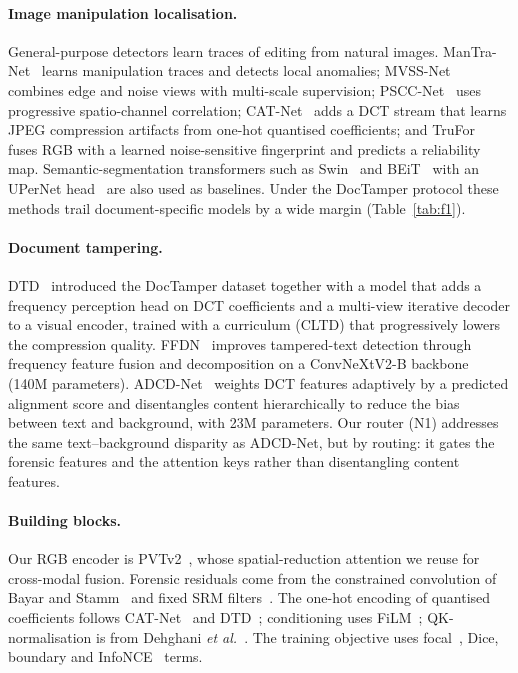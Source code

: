 \documentclass[11pt,a4paper]{article}
\begin{document}
\paragraph{Image manipulation localisation.} General-purpose detectors learn traces of
editing from natural images. ManTra-Net~\cite{mantra} learns manipulation traces and detects
local anomalies; MVSS-Net~\cite{mvss} combines edge and noise views with multi-scale
supervision; PSCC-Net~\cite{pscc} uses progressive spatio-channel correlation;
CAT-Net~\cite{catnet} adds a DCT stream that learns JPEG compression artifacts from one-hot
quantised coefficients; and TruFor~\cite{trufor} fuses RGB with a learned noise-sensitive
fingerprint and predicts a reliability map. Semantic-segmentation transformers such as
Swin~\cite{swin} and BEiT~\cite{beit} with an UPerNet head~\cite{upernet} are also used as
baselines. Under the DocTamper protocol these methods trail document-specific models by a
wide margin (Table~\ref{tab:f1}).

\paragraph{Document tampering.} DTD~\cite{dtd} introduced the DocTamper dataset together with
a model that adds a frequency perception head on DCT coefficients and a multi-view iterative
decoder to a visual encoder, trained with a curriculum (CLTD) that progressively lowers the
compression quality. FFDN~\cite{ffdn} improves tampered-text detection through frequency
feature fusion and decomposition on a ConvNeXtV2-B backbone (140M parameters).
ADCD-Net~\cite{adcd} weights DCT features adaptively by a predicted alignment score and
disentangles content hierarchically to reduce the bias between text and background, with
23M parameters. Our router (N1) addresses the same text--background disparity as ADCD-Net, but
by routing: it gates the forensic features and the attention keys rather than disentangling
content features.

\paragraph{Building blocks.} Our RGB encoder is PVTv2~\cite{pvtv2}, whose spatial-reduction
attention we reuse for cross-modal fusion. Forensic residuals come from the constrained
convolution of Bayar and Stamm~\cite{bayar} and fixed SRM filters~\cite{srm}. The one-hot
encoding of quantised coefficients follows CAT-Net~\cite{catnet} and DTD~\cite{dtd};
conditioning uses FiLM~\cite{film}; QK-normalisation is from Dehghani
\emph{et al.}~\cite{qknorm}. The training objective uses focal~\cite{focal}, Dice, boundary
\cite{boundary} and InfoNCE~\cite{infonce} terms.
\end{document}
